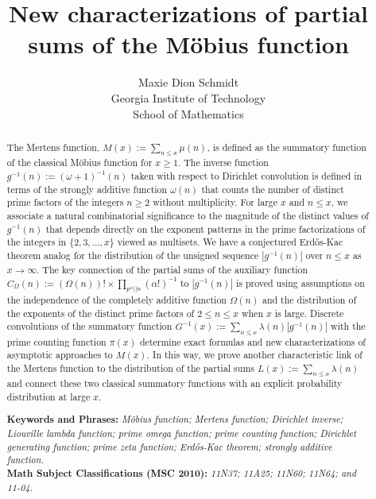 \documentclass[11pt,reqno,a4letter]{article}
\title{
       \LARGE{
       New characterizations of partial sums of the M\"obius function 
       } 
}
\author{{\Large Maxie Dion Schmidt} \\ 
        {\normalsize Georgia Institute of Technology} \\[0.025cm] 
        {\normalsize School of Mathematics} 
}
\numberwithin{figure}{section}
\numberwithin{table}{section}
\theoremstyle{plain}
\numberwithin{theorem}{section}
\theoremstyle{definition}
\begin{document}
 

\maketitle

\begin{abstract} 
The Mertens function, $M(x) := \sum_{n \leq x} \mu(n)$, is 
defined as the summatory function of the classical M\"obius function for $x \geq 1$. 
The inverse function $g^{-1}(n) := (\omega+1)^{-1}(n)$
taken with respect to Dirichlet convolution is defined in terms of the 
strongly additive function $\omega(n)$ that counts the 
number of distinct prime factors of the integers $n \geq 2$ without multiplicity. 
For large $x$ and $n \leq x$, we associate a natural combinatorial 
significance to the magnitude of the distinct values of 
$g^{-1}(n)$ that depends directly on the exponent patterns in the 
prime factorizations of the integers in $\{2,3,\ldots,x\}$ viewed as multisets. 
We have a conjectured Erd\H{o}s-Kac theorem analog for the distribution of the 
unsigned sequence $|g^{-1}(n)|$ over $n \leq x$ as $x \rightarrow \infty$. 
The key connection of the partial sums of the auxiliary function 
$C_{\Omega}(n) := (\Omega(n))! \times \prod_{p^{\alpha}||n} (\alpha!)^{-1}$ 
to $|g^{-1}(n)|$ is proved using assumptions on the independence of the completely 
additive function $\Omega(n)$ and the distribution of the exponents of the 
distinct prime factors of $2 \leq n \leq x$ when $x$ is large. 
Discrete convolutions of the summatory function 
$G^{-1}(x) := \sum_{n \leq x} \lambda(n) |g^{-1}(n)|$ with 
the prime counting function $\pi(x)$ determine 
exact formulas and new characterizations of asymptotic approaches to $M(x)$. 
In this way, we prove another characteristic 
link of the Mertens function to the distribution of the partial sums  
$L(x) := \sum_{n \leq x} \lambda(n)$ and connect these two classical 
summatory functions with an explicit probability distribution at large $x$. 

\bigskip 
\noindent
\textbf{Keywords and Phrases:} {\it M\"obius function; Mertens function; 
                                    Dirichlet inverse; Liouville lambda function; prime omega function; 
                                    prime counting function; Dirichlet generating function; 
                                    prime zeta function; 
                                    Erd\H{o}s-Kac theorem; strongly additive function. } \\ 
\textbf{Math Subject Classifications (MSC 2010):} {\it 11N37; 11A25; 11N60; 11N64; and 11-04. } 
\end{abstract} 
\end{document}
